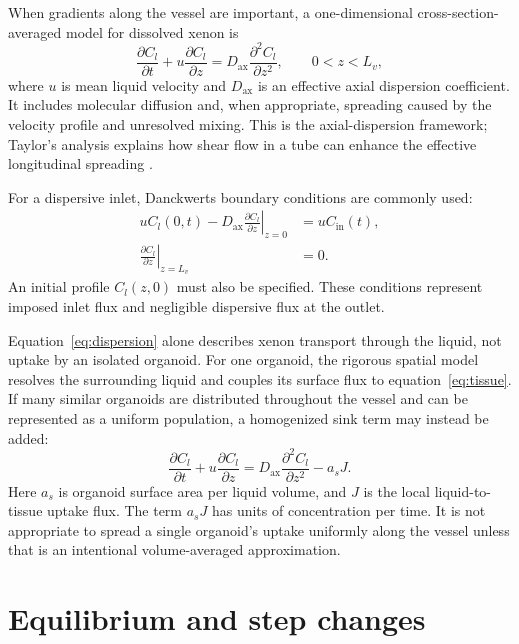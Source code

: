 \documentclass[11pt]{article}
\begin{document}
When gradients along the vessel are important, a one-dimensional
cross-section-averaged model for dissolved xenon is
\begin{equation}
  \frac{\partial C_l}{\partial t}
  + u\frac{\partial C_l}{\partial z}
  = D_{\mathrm{ax}}\frac{\partial^2 C_l}{\partial z^2},
  \qquad 0<z<L_v,
  \label{eq:dispersion}
\end{equation}
where \(u\) is mean liquid velocity and \(D_{\mathrm{ax}}\) is an effective
axial dispersion coefficient. It includes molecular diffusion and, when
appropriate, spreading caused by the velocity profile and unresolved
mixing. This is the axial-dispersion framework; Taylor's analysis explains
how shear flow in a tube can enhance the effective longitudinal spreading
\cite{Taylor1953}.

For a dispersive inlet, Danckwerts boundary conditions are commonly used:
\begin{align}
  uC_l(0,t)-D_{\mathrm{ax}}
  \left.\frac{\partial C_l}{\partial z}\right|_{z=0}
  &=uC_{\mathrm{in}}(t), \label{eq:inlet}\\
  \left.\frac{\partial C_l}{\partial z}\right|_{z=L_v}
  &=0. \label{eq:outlet}
\end{align}
An initial profile \(C_l(z,0)\) must also be specified. These conditions
represent imposed inlet flux and negligible dispersive flux at the outlet.

Equation~\eqref{eq:dispersion} alone describes xenon transport through the
liquid, not uptake by an isolated organoid. For one organoid, the rigorous
spatial model resolves the surrounding liquid and couples its surface flux
to equation~\eqref{eq:tissue}. If many similar organoids are distributed
throughout the vessel and can be represented as a uniform population, a
homogenized sink term may instead be added:
\begin{equation}
  \frac{\partial C_l}{\partial t}
  +u\frac{\partial C_l}{\partial z}
  =D_{\mathrm{ax}}\frac{\partial^2 C_l}{\partial z^2}
   -a_sJ.
  \label{eq:distributed-sink}
\end{equation}
Here \(a_s\) is organoid surface area per liquid volume, and \(J\) is the
local liquid-to-tissue uptake flux. The term \(a_sJ\) has units of
concentration per time. It is not appropriate to spread a single organoid's
uptake uniformly along the vessel unless that is an intentional
volume-averaged approximation.

\section{Equilibrium and step changes}
\end{document}
